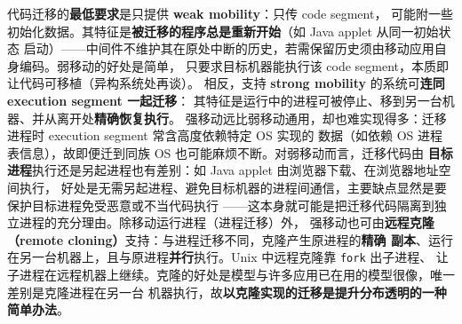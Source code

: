 \medskip\noindent 代码迁移的\textbf{最低要求}是只提供 \textbf{weak mobility}：只传 code segment，
可能附一些初始化数据。其特征是\textbf{被迁移的程序总是重新开始}（如 Java applet 从同一初始状态
启动）——中间件不维护其在原处中断的历史，若需保留历史须由移动应用自身编码。弱移动的好处是简单，
只要求目标机器能执行该 code segment，本质即让代码可移植（异构系统处再谈）。
相反，支持 \textbf{strong mobility} 的系统可\textbf{连同 execution segment 一起迁移}：
其特征是运行中的进程可被停止、移到另一台机器、并从离开处\textbf{精确恢复执行}。
强移动远比弱移动通用，却也难实现得多：迁移进程时 execution segment 常含高度依赖特定 OS 实现的
数据（如依赖 OS 进程表信息），故即便迁到同族 OS 也可能麻烦不断。对弱移动而言，迁移代码由
\textbf{目标进程}执行还是另起进程也有差别：如 Java applet 由浏览器下载、在浏览器地址空间执行，
好处是无需另起进程、避免目标机器的进程间通信，主要缺点显然是要保护目标进程免受恶意或不当代码执行
——这本身就可能是把迁移代码隔离到独立进程的充分理由。除移动运行进程（进程迁移）外，
强移动也可由\textbf{远程克隆（remote cloning）}支持：与进程迁移不同，克隆产生原进程的\textbf{精确
副本}、运行在另一台机器上，且与原进程\textbf{并行}执行。Unix 中远程克隆靠 \texttt{fork} 出子进程、
让子进程在远程机器上继续。克隆的好处是模型与许多应用已在用的模型很像，唯一差别是克隆进程在另一台
机器执行，故\textbf{以克隆实现的迁移是提升分布透明的一种简单办法}。

\begin{closeread}
\end{closeread}


